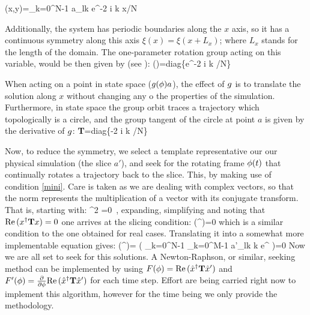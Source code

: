     \beq
    \xi(x,y)=\sum_{k=0}^{N-1} a_{lk} e^{-2 i \pi k x/N}

Additionally, the system has periodic boundaries along the $x$ axis, so
it has a continuous symmetry along this axis $\xi(x)=\xi(x+L_x)$; where
$L_x$ stands for the length of the domain. The one-parameter rotation
group acting on this variable, would be then given by (see
):
\beq
\LieEl(\gSpace)=\textrm{diag}\{e^{-2 i \pi k \gSpace/N}\}

When acting on a point in state space ($g({\bf \phi}) a$), the effect
of $g$ is to translate the solution along $x$ without changing any o
the properties of the simulation. Furthermore, in state space the group
orbit traces a trajectory which topologically is a circle, and the group
tangent of the circle at point $a$ is given by the derivative of
$g$:
\beq
\textbf{T}=\textrm{diag}\{-2 i \pi k /N\}

Now, to reduce the symmetry, we select a template representative our our
physical simulation (the slice $a'$), and seek for the rotating frame
${\bf \phi}(t)$ that continually rotates a trajectory back to the slice.
This, by making use of condition \ref{mini}. Care is taken as we are
dealing with complex vectors, so that the norm represents the
multiplication of a vector with its conjugate transform. That is,
starting with:
\beq
\frac{\partial}{\partial \gSpace} \norm{\ssp-\LieEl\slicep}^2 =0
\,,
expanding, simplifying and noting that ${\rm Re}\,(x^\dagger \mathbf{T} x)=0$ one
arrives at the slicing condition:
\beq
    \Re(\sspRed^\dagger \Lg \slicep)=0
which is a similar condition to the one obtained for real cases.
Translating it into a somewhat more implementable equation gives:
\beq
    \Re(\sspRed^\dagger \Lg \slicep)=
    \Re\left( \sum_{k=0}^{N-1} \sum_{k=0}^{M-1}
     a'_{lk} k e^{ \gSpace}
        \right)=0
Now we are all set to seek for this solutions. A Newton-Raphson, or
similar, seeking method can be implemented by using
$F({\bf \phi})={\rm Re}\,(\hat{x}^\dagger \mathbf{T} {\hat{x}'})$ and
$F'({\bf \phi})=\frac{\partial}{\partial {\bf \phi}}{\rm Re}\,(\hat{x}^\dagger \mathbf{T}
{\hat{x}'})$ for each time step. Effort are being carried right now to
implement this algorithm, however for the time being we only provide the
methodology.


